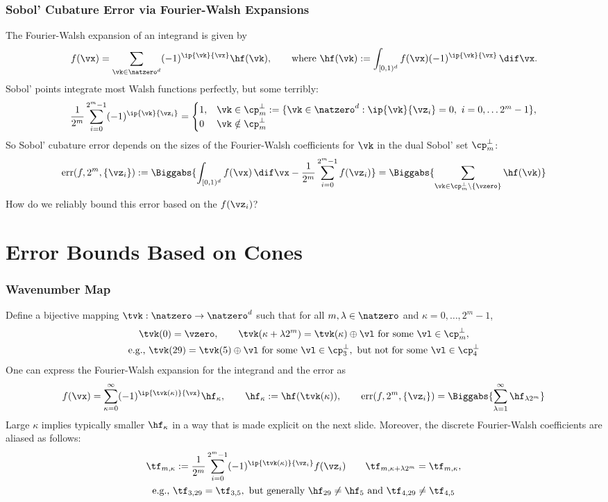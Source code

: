 \documentclass[10pt,compress]{beamer} %
\DeclareMathOperator{\err}{err}
\newcommand{\cube}{[0,1)^d}
\newcommand{\desall}{\{\vz_i\}}
\begin{document}
\begin{frame}\frametitle{Sobol' Cubature Error via Fourier-Walsh Expansions}
The Fourier-Walsh expansion of an integrand is given by 
\[
f(\vx) = \sum_{\vk \in \natzero^d} (-1)^{\ip{\vk}{\vx}} \hf(\vk) , \qquad \text{where } \hf(\vk) := \int_{\cube} f(\vx)(-1)^{\ip{\vk}{\vx}} \, \dif \vx.
\]
Sobol' points integrate most Walsh functions perfectly, but some terribly:
\[
\frac 1 {2^m} \sum_{i=0}^{2^m-1} (-1)^{\ip{\vk}{\vz_i}} =
\begin{cases} 1, & \vk \in \cp^{\perp}_m := \{ \vk \in \natzero^d : \ip{\vk}{\vz_i}=0, \ i=0, \ldots 2^{m}-1\}, \\
0 & \vk \notin \cp^{\perp}_m
\end{cases}
\]
So Sobol' cubature error depends on the sizes of the Fourier-Walsh coefficients for $\vk$ in the \alert{dual Sobol' set} $\cp^{\perp}_m$:
\[
\err(f,2^m,\desall) := 
\Biggabs{\int_{\cube} f(\vx) \, \dif \vx -  \frac 1 {2^m} \sum_{i=0}^{2^m-1} f(\vz_i)} = 
\Biggabs{\sum_{\vk \in \cp^{\perp}_m\setminus\{\vzero\}} \hf(\vk)}
\]
\alert{How do we reliably bound this error based on the $f(\vz_i)$?}
\end{frame}

\section{Error Bounds Based on Cones}
\begin{frame}\frametitle{Wavenumber Map}
Define a bijective  mapping $\tvk:\natzero \to \natzero^d$ such that for all $m,\lambda \in \natzero$ and $\kappa=0, \ldots, 2^m-1$,
\begin{gather*}
\tvk(0) = \vzero, \qquad \tvk(\kappa+\lambda 2^m)=\tvk(\kappa) \oplus \vl \text{ for some }\vl \in \cp_m^{\perp}, \\
\text{e.g., } \tvk(29) = \tvk(5) \oplus \vl \text{ for some }\vl \in \cp_3^{\perp}, \text{ but not for some }\vl \in \cp_4^{\perp}
\end{gather*}
One can express the Fourier-Walsh expansion for the integrand and the error as 
\begin{equation*}
f(\vx) = \sum_{\kappa=0}^{\infty} (-1)^{\ip{\tvk(\kappa)}{\vx}} \hf_{\kappa}, \qquad
\hf_{\kappa}:=\hf(\tvk(\kappa)), \qquad 
\err(f,2^m,\desall) = \Biggabs{\sum_{\lambda=1}^{\infty} \hf_{\lambda 2^m}}
\end{equation*}
\alert{Large $\kappa$ implies typically smaller $\hf_{\kappa}$} in a way that is made explicit on the next slide.
Moreover, the \alert{discrete} Fourier-Walsh coefficients are \alert{aliased} as follows:
\begin{gather*}
\tf_{m,\kappa}:= \frac{1}{2^m} \sum_{i=0}^{2^m-1} (-1)^{\ip{\tvk(\kappa)}{\vz_i}} f(\vz_i) \qquad 
\tf_{m,\kappa+\lambda 2^m} = \tf_{m,\kappa}, \\ 
\text{e.g., } \tf_{3,29} = \tf_{3,5}, \text{ but generally } \hf_{29} \ne \hf_{5} \text{ and } \tf_{4,29} \ne \tf_{4,5}
\end{gather*}

\end{frame}
\end{document}
